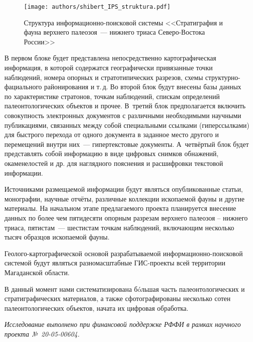 \begin{figure}[H]
  \centering
  \texttt{[image: authors/shibert\_IPS\_struktura.pdf]}
  \caption{Структура информационно-поисковой системы <<Стратиграфия и фауна верхнего палеозоя~--- нижнего триаса Северо-Востока России>>}
  \label{fig:shibert_IPS_struktura.pdf}
\end{figure}

В первом блоке будет представлена непосредственно картографическая информация, в которой содержатся географически привязанные точки наблюдений, номера опорных и стратотипических разрезов, схемы структурно-фациального районирования и т.\,д. Во второй блок будут внесены базы данных по характеристике стратонов, точкам наблюдений, спискам определений палеонтологических объектов и прочее. В~третий блок предполагается включить совокупность электронных документов с различными необходимыми научными публикациями, связанных между собой специальными ссылками (гиперссылками) для быстрого перехода от одного документа в заданное место другого и перемещений внутри них~--- гипертекстовые документы. А~четвёртый блок будет представлять собой информацию в виде цифровых снимков обнажений, окаменелостей и др. для наглядного пояснения и расшифровки текстовой информации.

Источниками размещаемой информации будут являться опубликованные статьи, монографии, научные отчёты, различные коллекции ископаемой фауны и другие материалы. На начальном этапе предлагаемого проекта планируется внесение данных по более чем пятидесяти опорным разрезам верхнего палеозоя -- нижнего триаса, пятистам~--- шестистам точкам наблюдений, включающим несколько тысяч образцов ископаемой фауны.

Геолого-картографической основой разрабатываемой информационно-поисковой системой будут являться разномасштабные ГИС-проекты всей территории Магаданской области.

В данный момент нами систематизирована бóльшая часть палеонтологических и стратиграфических материалов, а также сфотографированы несколько сотен палеонтологических объектов, начата их цифровая обработка.

\textit{Исследование выполнено при финансовой поддержке РФФИ в рамках научного проекта №~20-05-00604.}



